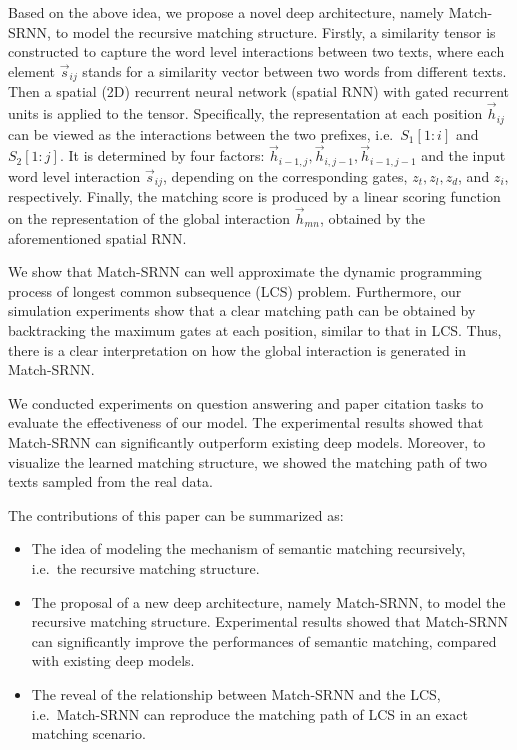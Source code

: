 Based on the above idea, we propose a novel deep architecture, namely Match-SRNN, to model the recursive matching structure. Firstly, a similarity tensor is constructed to capture the word level interactions between two texts, where each element $\vec{s}_{ij}$ stands for a similarity vector between two words from different texts. Then a spatial (2D) recurrent neural network (spatial RNN) with gated recurrent units is applied to the tensor. Specifically, the representation at each position $\vec{h}_{ij}$ can be viewed as the interactions between the two prefixes, i.e.~${S_1[1{:}i]}$ and ${S_2[1{:}j]}$. It is determined by four factors: $\vec{h}_{i-1,j},\vec{h}_{i,j-1},\vec{h}_{i-1,j-1}$ and the input word level interaction $\vec{s}_{ij}$, depending on the corresponding gates, $z_t,z_l,z_d$, and $z_i$, respectively. Finally, the matching score is produced by a linear scoring function on the representation of the global interaction $\vec{h}_{mn}$, obtained by the aforementioned spatial RNN.


We show that Match-SRNN can well approximate the dynamic programming process of longest common subsequence (LCS) problem. Furthermore, our simulation experiments show that a clear matching path can be obtained by backtracking the maximum gates at each position, similar to that in LCS.  Thus, there is a clear interpretation on how the global interaction is generated in Match-SRNN.

We conducted experiments on question answering and paper citation tasks to evaluate the effectiveness of our model.
The experimental results showed that Match-SRNN can significantly outperform existing deep models. Moreover, to visualize the learned matching structure, we showed the matching path of two texts sampled from the real data.

The contributions of this paper can be summarized as:
\begin{itemize}
\item The idea of modeling the mechanism of semantic matching recursively, i.e.~the recursive matching structure.
\item The proposal of a new deep architecture, namely Match-SRNN, to model the recursive matching structure. Experimental results showed that Match-SRNN can significantly improve the performances of semantic matching, compared with existing deep models.
\item The reveal of the relationship between Match-SRNN and the LCS, i.e.~Match-SRNN can reproduce the matching path of LCS in an exact matching scenario.
\end{itemize}

